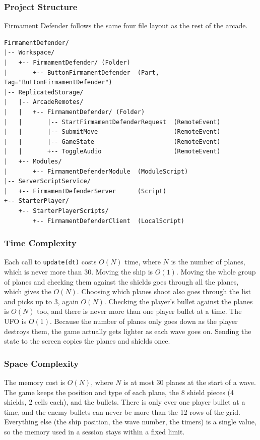\documentclass[12pt,letterpaper]{article}
\begin{document}
\subsubsection{Project Structure}

Firmament Defender follows the same four file layout as the rest of the arcade.

\begin{lstlisting}
FirmamentDefender/
|-- Workspace/
|   +-- FirmamentDefender/ (Folder)
|       +-- ButtonFirmamentDefender  (Part, Tag="ButtonFirmamentDefender")
|-- ReplicatedStorage/
|   |-- ArcadeRemotes/
|   |   +-- FirmamentDefender/ (Folder)
|   |       |-- StartFirmamentDefenderRequest  (RemoteEvent)
|   |       |-- SubmitMove                     (RemoteEvent)
|   |       |-- GameState                      (RemoteEvent)
|   |       +-- ToggleAudio                    (RemoteEvent)
|   +-- Modules/
|       +-- FirmamentDefenderModule  (ModuleScript)
|-- ServerScriptService/
|   +-- FirmamentDefenderServer      (Script)
+-- StarterPlayer/
    +-- StarterPlayerScripts/
        +-- FirmamentDefenderClient  (LocalScript)
\end{lstlisting}

\subsubsection{Time Complexity}

Each call to \texttt{update(dt)} costs $O(N)$ time, where $N$ is the number of planes, which is never more than 30. Moving the ship is $O(1)$. Moving the whole group of planes and checking them against the shields goes through all the planes, which gives the $O(N)$. Choosing which planes shoot also goes through the list and picks up to 3, again $O(N)$. Checking the player's bullet against the planes is $O(N)$ too, and there is never more than one player bullet at a time. The UFO is $O(1)$. Because the number of planes only goes down as the player destroys them, the game actually gets lighter as each wave goes on. Sending the state to the screen copies the planes and shields once.

\subsubsection{Space Complexity}

The memory cost is $O(N)$, where $N$ is at most 30 planes at the start of a wave. The game keeps the position and type of each plane, the 8 shield pieces (4 shields, 2 cells each), and the bullets. There is only ever one player bullet at a time, and the enemy bullets can never be more than the 12 rows of the grid. Everything else (the ship position, the wave number, the timers) is a single value, so the memory used in a session stays within a fixed limit.
\end{document}
